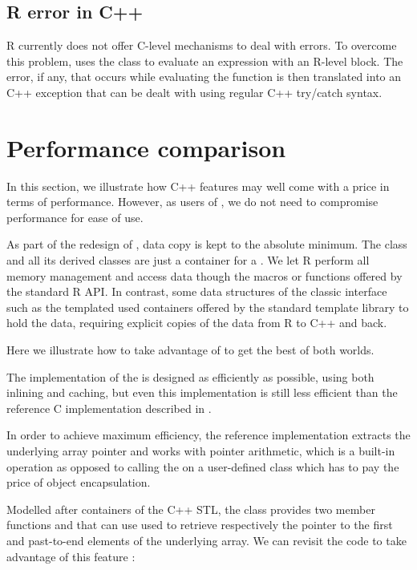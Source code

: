 \subsection{R error in C++}

R currently does not offer C-level mechanisms to deal with errors. To 
overcome this problem,  uses the 
class to evaluate an expression with an R-level 
block. The error, if any, that occurs while evaluating the 
function is then translated into an C++ exception that can be dealt with using 
regular C++ try/catch syntax.

\section{Performance comparison}

In this section, we illustrate how C++ features may well come with a price
in terms of performance. However, as users of , we do not need to
compromise performance for ease of use.

As part of the redesign of , data copy is kept to the
absolute minimum. The  class and all its derived
classes are just a container for a . We let R perform
all memory management and access data though the macros or functions
offered by the standard R API. In contrast, some data structures
of the classic  interface such as the templated 
 used containers offered by the standard template
library to hold the data, requiring explicit copies of the data 
from R to C++ and back.

Here we illustrate how to take advantage of  to get
the best of both worlds. 

The implementation of the  is designed as 
efficiently as possible, using both inlining and caching, 
but even this implementation is still less efficient than the 
reference C implementation described in \cite{R:exts}.

In order to achieve maximum efficiency, the reference implementation
extracts the underlying array pointer  and works 
with pointer arithmetic, which is a built-in operation as opposed to 
calling the  on a user-defined class which has to 
pay the price of object encapsulation.

Modelled after containers of the C++ STL,
the  class provides two member functions 
and  that can use used to retrieve respectively 
the pointer to the first and past-to-end elements of the underlying array.
We can revisit the code to take advantage of this feature : 

